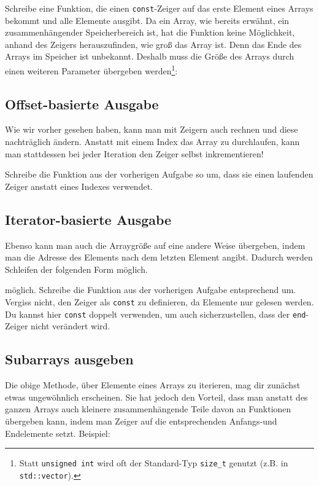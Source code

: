 Schreibe eine Funktion, die einen \lstinline{const}-Zeiger auf das erste Element eines Arrays bekommt und alle Elemente ausgibt.
Da ein Array, wie bereits erwähnt, ein zusammenhängender Speicherbereich ist, hat die Funktion keine Möglichkeit, anhand des Zeigers herauszufinden, wie groß das Array ist. Denn das Ende des Arrays im Speicher ist unbekannt. Deshalb muss die Größe des Arrays durch einen weiteren Parameter übergeben werden\footnote{Statt \lstinline{unsigned int} wird oft der Standard-Typ \lstinline{size_t} genutzt (z.B. in \lstinline{std::vector}).}:


\subsection{Offset-basierte Ausgabe}
Wie wir vorher gesehen haben, kann man mit Zeigern auch rechnen und diese nachträglich ändern.
Anstatt mit einem Index das Array zu durchlaufen, kann man stattdessen bei jeder Iteration den Zeiger selbst inkrementieren!


Schreibe die Funktion aus der vorherigen Aufgabe so um, dass sie einen laufenden Zeiger anstatt eines Indexes verwendet.

\subsection{Iterator-basierte Ausgabe}
Ebenso kann man auch die Arraygröße auf eine andere Weise übergeben, indem man die Adresse des Elements nach dem letzten Element angibt.
Dadurch werden Schleifen der folgenden Form möglich.


möglich.
Schreibe die Funktion aus der vorherigen Aufgabe entsprechend um.
Vergiss nicht, den Zeiger als \lstinline{const} zu definieren, da Elemente nur gelesen werden.
Du kannst hier \lstinline{const} doppelt verwenden, um auch sicherzustellen, dass der \lstinline{end}-Zeiger nicht verändert wird.

\subsection{Subarrays ausgeben}
Die obige Methode, über Elemente eines Arrays zu iterieren, mag dir zunächst etwas ungewöhnlich erscheinen.
Sie hat jedoch den Vorteil, dass man anstatt des ganzen Arrays auch kleinere zusammenhängende Teile davon an Funktionen übergeben kann, indem man Zeiger auf die entsprechenden Anfangs-und Endelemente setzt.
Beispiel:

